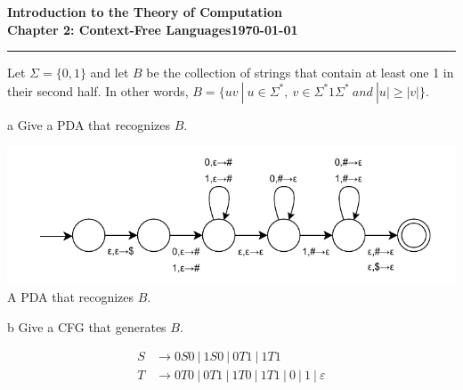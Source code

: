 \documentclass[11pt]{article}
\newcommand{\dated}{\today}
\begin{document}
\textbf{Introduction to the Theory of
Computation}\hfill\textbf{\myname}\\[0.01in]
\textbf{Chapter 2: Context-Free Languages}\hfill\textbf{\dated}\\
\smallskip\hrule\bigskip

\begin{problem}{2.47}
Let $\Sigma = \{0,1\}$ and let $B$ be the collection of strings that contain at least one 1 in their second half. In other words, $B = \{uv \ | \ u \in \Sigma^{*}, \ v \in \Sigma^{*}1\Sigma^{*} \ and \ |u| \geq |v|\}$.
\end{problem}

\begin{problem}[Part]{a}
Give a PDA that recognizes $B$.
\end{problem}

\begin{center}
\includegraphics[scale=1.4]{Figures/Problem2.47.pdf} \\
A PDA that recognizes $B$.
\end{center}

\begin{problem}[Part]{b}
Give a CFG that generates $B$.
\end{problem}
\begin{align*}
S &\rightarrow 0S0 \ | \ 1S0 \ | \ 0T1 \ | \ 1T1 \\
T &\rightarrow 0T0 \ | \ 0T1 \ | \ 1T0 \ | \ 1T1 \ | \ 0 \ | \ 1 \ | \ \varepsilon \\
\end{align*}
\end{document}
